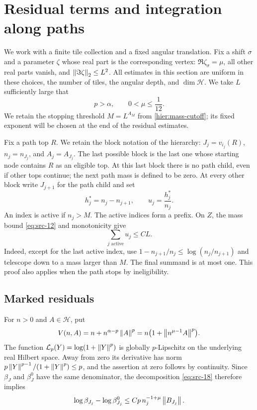\section{Residual terms and integration along paths}
\label{res:section}

We work with a finite tile collection and a fixed angular translation.
Fix a shift $\sigma$ and a parameter $\zeta$ whose real part is the
corresponding vertex: $\Re\zeta_\sigma=\mu$, all other real parts vanish,
and $\left\|\Im\zeta\right\|_2\le L^2$.  All estimates in this section are
uniform in these choices, the number of tiles, the angular depth, and
$\dim\mathcal H$.  We take $L$ sufficiently large that
\begin{equation}
  p>\alpha,\qquad 0<\mu\le\frac1{12}.
  \label{res:small-mu}
\end{equation}
We retain the stopping threshold $M=L^{A_M}$ from
\eqref{hier:mass-cutoff}; its fixed exponent will be chosen at the end
of the residual estimates.

Fix a path top $R$.  We retain the block notation of the hierarchy:
$J_j=v_{i_j}(R)$, $n_j=n_{J_j}$, and $A_j=A_{J_j}$.
The last possible block is the last one whose starting node contains
$R$ as an eligible top.  At this last block there is no path child,
even if other tops continue; the next path mass is defined to be zero.
At every other block write $J_{j+1}$ for the path child and set
\[
  h_j^*=n_j-n_{j+1},\qquad u_j=\frac{h_j^*}{n_j}.
\]
An index is active if $n_j>M$.  The active indices form a prefix.
On $Z$, the mass bound \eqref{eq:src-12} and monotonicity give
\begin{equation}
  \sum_{j\text{ active}}u_j\le C L.
  \label{res:relative-drop-sum}
\end{equation}
Indeed, except for the last active index, use
$1-n_{j+1}/n_j\le\log(n_j/n_{j+1})$ and telescope down to a mass
larger than $M$.  The final summand is at most one.  This proof also
applies when the path stops by ineligibility.

\subsection{Marked residuals}

For $n>0$ and $A\in\mathcal H$, put
\[
  V(n,A)=n+n^{\alpha-p}\left\|A\right\|^{p}
        =n\bigl(1+\left\|n^{\mu-1}A\right\|^{p}\bigr).
\]
The function $\mathcal L_p(Y)=\log(1+\left\|Y\right\|^{p})$ is globally
$p$-Lipschitz on the underlying real Hilbert space.  Away from zero
its derivative has norm
$p\left\|Y\right\|^{p-1}/(1+\left\|Y\right\|^{p})\le p$, and the assertion at zero
follows by continuity.  Since $\beta_J$ and $\beta_J^0$ have the same
denominator, the decomposition \eqref{eq:src-18} therefore implies
\begin{equation}
  \log\beta_{J_j}-\log\beta_{J_j}^0
       \le Cp\,n_j^{-1+\mu}\left\|B_{J_j}\right\|.
  \label{eq:src-27}
\end{equation}

